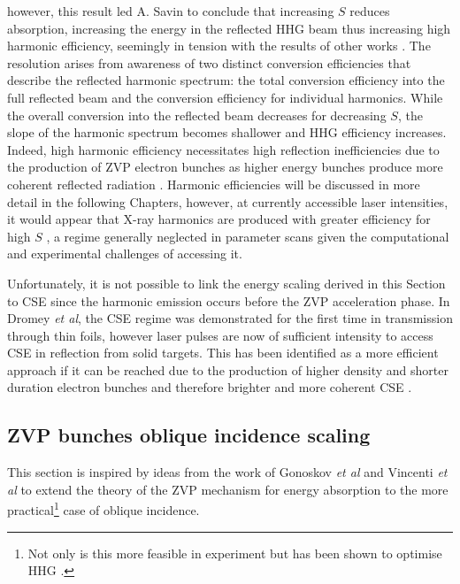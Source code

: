 however, this result led A. Savin to conclude that increasing $S$ reduces absorption, increasing the energy in the reflected \ac{HHG} beam thus increasing high harmonic efficiency, seemingly in tension with the results of other works \cite{gonoskovUltrarelativisticNanoplasmonicsRoute2011,edwardsXRayEmissionEffectiveness2020}. The resolution arises from awareness of two distinct conversion efficiencies that describe the reflected harmonic spectrum: the total conversion efficiency into the full reflected beam and the conversion efficiency for individual harmonics. While the overall conversion into the reflected beam decreases for decreasing $S$, the slope of the harmonic spectrum becomes shallower and \ac{HHG} efficiency increases. Indeed, high harmonic efficiency necessitates high reflection inefficiencies due to the production of ZVP electron bunches as higher energy bunches produce more coherent reflected radiation \cite{edwardsXRayEmissionEffectiveness2020}. Harmonic efficiencies will be discussed in more detail in the following Chapters, however, at currently accessible laser intensities, it would appear that X-ray harmonics are produced with greater efficiency for high $S$ \cite{pukhovRelativisticHighHarmonics2009}, a regime generally neglected in parameter scans given the computational and experimental challenges of accessing it.

Unfortunately, it is not possible to link the energy scaling derived in this Section to \ac{CSE} since the harmonic emission occurs before the \ac{ZVP} acceleration phase. In Dromey \textit{et al}, the \ac{CSE} regime was demonstrated for the first time in transmission through thin foils, however laser pulses are now of sufficient intensity to access \ac{CSE} in reflection from solid targets. This has been identified as a more efficient approach if it can be reached due to the production of higher density and shorter duration electron bunches and therefore brighter and more coherent \ac{CSE} \cite{edwardsElectronNanobunchWidthDominatedSpectralPower2020}. 

\subsection{ZVP bunches oblique incidence scaling}
This section is inspired by ideas from the work of Gonoskov \textit{et al} \cite{gonoskovUltrarelativisticNanoplasmonicsRoute2011} and Vincenti \textit{et al} \cite{vincentiOpticalPropertiesRelativistic2014} to extend the theory of the ZVP mechanism for energy absorption to the more practical\footnote{Not only is this more feasible in experiment but has been shown to optimise HHG \cite{gonoskovUltrarelativisticNanoplasmonicsRoute2011}.} case of oblique incidence. 

